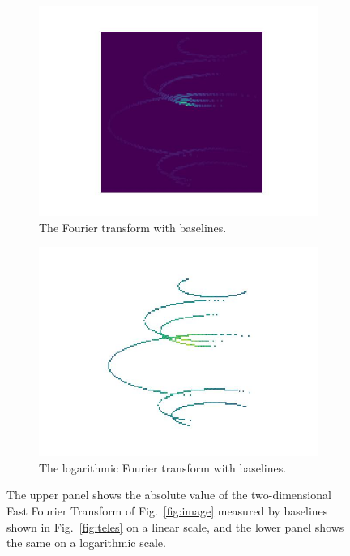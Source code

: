 \begin{figure}
	\centering
	\begin{subfigure}{\linewidth}
		\includegraphics[width=\linewidth]{fig/ft/ft_base.jpg}
		\caption{The Fourier transform with baselines.}
	\end{subfigure}\hfill
	\begin{subfigure}{\linewidth}
		\includegraphics[width=\linewidth]{fig/ft/ft_log_base.jpg}
		\caption{The logarithmic Fourier transform with baselines.}
	\end{subfigure}
	\caption{The upper panel shows the absolute value of the two-dimensional Fast Fourier Transform of Fig.~\ref{fig:image} measured by baselines shown in Fig.~\ref{fig:teles} on a linear scale, and the lower panel shows the same on a logarithmic scale.}
	\label{fig:ft_base}
\end{figure}


